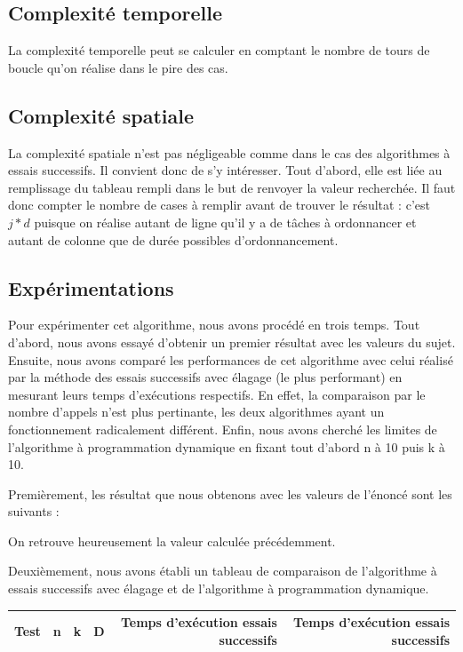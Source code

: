 \documentclass[a4paper, titlepage]{article}
\begin{document}
	\subsection{Complexité temporelle}
		La complexité temporelle peut se calculer en comptant le nombre de tours de boucle qu'on réalise dans le pire des cas.
		
	\subsection{Complexité spatiale}
		La complexité spatiale n'est pas négligeable comme dans le cas des algorithmes à essais successifs.
		Il convient donc de s'y intéresser.
		Tout d'abord, elle est liée au remplissage du tableau rempli dans le but de renvoyer la valeur recherchée.
		Il faut donc compter le nombre de cases à remplir avant de trouver le résultat : c'est $j*d$ puisque on réalise autant de ligne qu'il y a de tâches à ordonnancer et autant de colonne que de durée possibles d'ordonnancement.
	
	\subsection{Expérimentations}
		Pour expérimenter cet algorithme, nous avons procédé en trois temps.
		Tout d'abord, nous avons essayé d'obtenir un premier résultat avec les valeurs du sujet.
		Ensuite, nous avons comparé les performances de cet algorithme avec celui réalisé par la méthode des essais successifs avec élagage (le plus performant) en mesurant leurs temps d'exécutions respectifs.
		En effet, la comparaison par le nombre d'appels n'est plus pertinante, les deux algorithmes ayant un fonctionnement radicalement différent.
		Enfin, nous avons cherché les limites de l'algorithme à programmation dynamique en fixant tout d'abord n à 10 puis k à 10.
		
		Premièrement, les résultat que nous obtenons avec les valeurs de l'énoncé sont les suivants :
		
		On retrouve heureusement la valeur calculée précédemment.
		
		Deuxièmement, nous avons établi un tableau de comparaison de l'algorithme à essais successifs avec élagage et de l'algorithme à programmation dynamique.

		\begin{center}
		\begin{tabular}{|c|c|c|c|r|r|}
			\hline
			Test	& n	& k	& D	& Temps d'exécution essais successifs & Temps d'exécution essais successifs \\
			\hline
		\end{tabular}
		\end{center}
		
\end{document}
